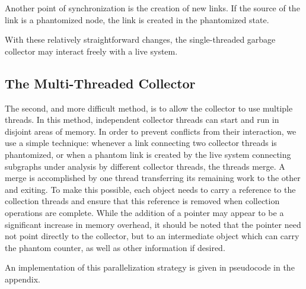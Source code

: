 Another point of synchronization is the creation of new links. If the
source of the link is a phantomized node, the link is created in the phantomized
state. %

With these relatively straightforward changes, the single-threaded garbage collector
may interact freely with a live system.

%


\subsection{The Multi-Threaded Collector}

The second, and more difficult method, is to allow the collector to
use multiple threads. In this method, independent collector threads can
start and run in disjoint areas of memory. In order to prevent conflicts
from their interaction, we use a simple technique: whenever a link
connecting two collector threads is
phantomized, or when a phantom link is created by the live system connecting
subgraphs under analysis by different collector threads, the threads merge. %
A merge is accomplished by one thread
transferring its remaining work to the other and exiting. To make this possible, each
object needs to carry a reference to the collection threads and ensure that this
reference is removed when collection operations are complete. While the addition
of a pointer may appear to be a significant increase in memory overhead, it should be noted that
the pointer need not point directly to the collector, but to an intermediate object which can
carry the phantom counter, as well as other information if desired.

An implementation of this parallelization strategy is given in pseudocode in the appendix.

%






